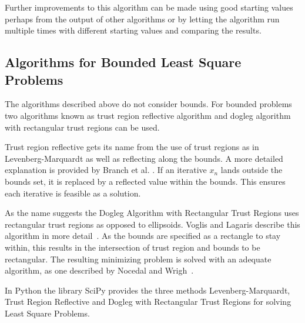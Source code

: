 Further improvements to this algorithm can be made using good starting values perhaps from the output of other algorithms or by letting the algorithm run multiple times with different starting values and comparing the results.

\newpage
\subsection{Algorithms for Bounded Least Square Problems}
\label{subsec:algorithms_bounded_lsp}

The algorithms described above do not consider bounds. For bounded problems two algorithms known as trust region reflective algorithm and dogleg algorithm with rectangular trust regions can be used.

Trust region reflective gets its name from the use of trust regions as in Levenberg-Marquardt as well as reflecting along the bounds. A more detailed explanation is provided by Branch et al. \cite{branch1999}. If an iterative $x_n$ lands outside the bounds set, it is replaced by a reflected value within the bounds. This ensures each iterative is feasible as a solution.

As the name suggests the Dogleg Algorithm with Rectangular Trust Regions uses rectangular trust regions as opposed to ellipsoids. Voglis and Lagaris describe this algorithm in more detail~\cite{voglis2004}. As the bounds are specified as a rectangle to stay within, this results in the intersection of trust region and bounds to be rectangular. The resulting minimizing problem is solved with an adequate algorithm, as one described by Nocedal and Wrigh~\cite{Nocedal1999}.

In Python the library SciPy provides the three methods Levenberg-Marquardt, Trust Region Reflective and Dogleg with Rectangular Trust Regions for solving Least Square Problems.
